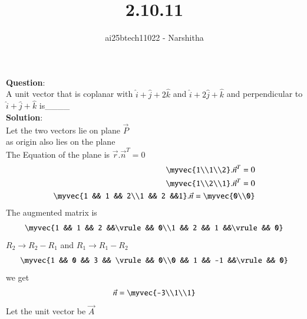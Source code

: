 \documentclass[journal,12pt,onecolumn]{IEEEtran}
\theoremstyle{remark}
\begin{document}
\title{2.10.11}
\author{ai25btech11022 - Narshitha}
\maketitle
\renewcommand{\thefigure}{\theenumi}
\renewcommand{\thetable}{\theenumi}
\textbf{Question}:\\
A unit vector that is coplanar with $\hat{i}+\hat{j}+2\hat{k}$ and $\hat{i}+2\hat{j}+\hat{k}$ and perpendicular to $\hat{i}+\hat{j}+\hat{k}$ is\_\_\_\_\\
\textbf{Solution}:\\
Let the two vectors lie on plane $\vec{P}$\\
as origin also lies on the plane\\
The Equation of the plane is $\vec{r}.{\vec{n}^T}=0$
\begin{align}
    \myvec{1\\1\\2}.{\vec{n}}^T=0\\
    \myvec{1\\2\\1}.{\vec{n}}^T=0\\
    \myvec{1 && 1 && 2\\1 && 2 &&1}.\vec{n}=\myvec{0\\0}\\
\end{align}
The augmented  matrix is
\begin{align}
    \myvec{1 && 1 && 2 &&\vrule&& 0\\1 && 2 && 1 &&\vrule&& 0}\\
\end{align}  
$R_2\rightarrow R_2-R_1$ and $R_1\rightarrow R_1-R_2$\\
\begin{align}
    \myvec{1 && 0 && 3 && \vrule&& 0\\0 && 1 && -1 &&\vrule&& 0}
\end{align}
we get\\
\begin{align}
    \vec{n}=\myvec{-3\\1\\1}
\end{align}
Let the unit vector be $\vec{A}$\\
\end{document}
